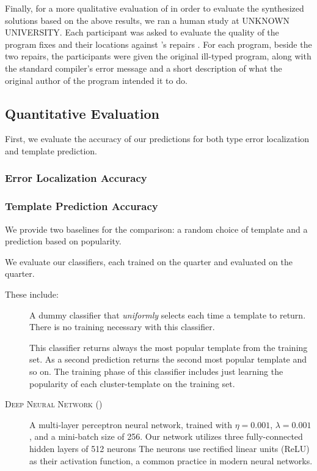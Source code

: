 Finally, for a more qualitative evaluation of \toolname in order to evaluate the
synthesized solutions based on the above results, we ran a human study at
UNKNOWN UNIVERSITY. Each participant was asked to evaluate the quality of the
program fixes and their locations against \seminal's repairs
\citep[][]{Lerner2006-pj, Lerner2007-dt}. For each program, beside the two
repairs, the participants were given the original ill-typed program, along with
the standard \ocaml compiler's error message and a short description of what the
original author of the program intended it to do.

\subsection{Quantitative Evaluation}
\label{subsec:quan_eval}

First, we evaluate the accuracy of our predictions for both type error localization and template prediction.

\subsubsection{Error Localization Accuracy}
\label{subsubsec:error_loc_acc}



\subsubsection{Template Prediction Accuracy}
\label{subsubsec:templ_acc}

We provide two baselines for the comparison: a random choice of template and a
prediction based on popularity.

We evaluate our classifiers, each trained on the \SPRING quarter and evaluated
on the \FALL quarter.

These include:
%
\begin{description}
  \item[\random] A dummy classifier that \emph{uniformly} selects each time a
    template to return. There is no training necessary with this classifier.
  \item[\popular] This classifier returns always the most popular template from
    the training set. As a second prediction returns the second most popular
    template and so on. The training phase of this classifier includes just
    learning the popularity of each cluster-template on the training set.
  \item[\textsc{Deep Neural Network} (\dnn)] A multi-layer perceptron neural
    network, trained with $\eta = 0.001$, $\lambda = 0.001$, and a mini-batch
    size of 256. Our network utilizes three fully-connected hidden layers of 512
    neurons The neurons use rectified linear units (ReLU) as their activation
    function, a common practice in modern neural networks.
\end{description}


